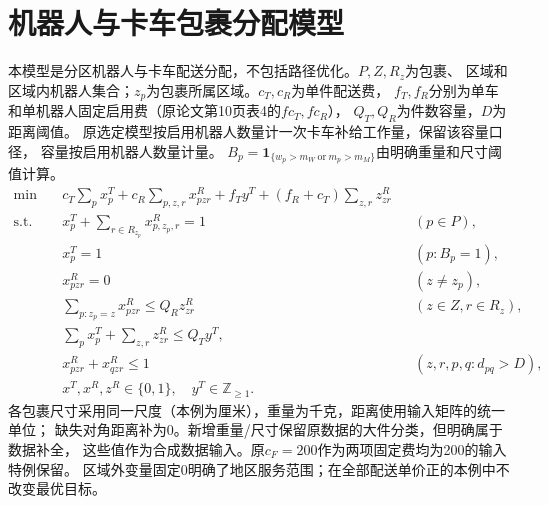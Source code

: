 \documentclass[UTF8]{ctexart}
\begin{document}
\section*{机器人与卡车包裹分配模型}

本模型是分区机器人与卡车配送分配，不包括路径优化。$P,Z,R_z$为包裹、
区域和区域内机器人集合；$z_p$为包裹所属区域。$c_T,c_R$为单件配送费，
$f_T,f_R$分别为单车和单机器人固定启用费（原论文第10页表4的$fc_T,fc_R$），
$Q_T,Q_R$为件数容量，$D$为距离阈值。
原选定模型按启用机器人数量计一次卡车补给工作量，保留该容量口径，
容量按启用机器人数量计量。
$B_p=\mathbf1_{\{w_p>m_W\ \mathrm{or}\ m_p>m_M\}}$由明确重量和尺寸阈值计算。
\begin{align*}
\min\quad &c_T\sum_px^T_p+c_R\sum_{p,z,r}x^R_{pzr}
+f_Ty^T+(f_R+c_T)\sum_{z,r}z^R_{zr}\\
\text{s.t.}\quad&
x^T_p+\sum_{r\in R_{z_p}}x^R_{p,z_p,r}=1&&(p\in P),\\
&x^T_p=1&&(p:B_p=1),\\
&x^R_{pzr}=0&&(z\ne z_p),\\
&\sum_{p:z_p=z}x^R_{pzr}\le Q_Rz^R_{zr}&&(z\in Z,r\in R_z),\\
&\sum_px^T_p+\sum_{z,r}z^R_{zr}\le Q_Ty^T,\\
&x^R_{pzr}+x^R_{qzr}\le1&&(z,r,p,q:d_{pq}>D),\\
&x^T,x^R,z^R\in\{0,1\},\quad y^T\in\mathbb Z_{\ge1}.
\end{align*}
各包裹尺寸采用同一尺度（本例为厘米），重量为千克，距离使用输入矩阵的统一单位；
缺失对角距离补为0。新增重量/尺寸保留原数据的大件分类，但明确属于数据补全，
这些值作为合成数据输入。原$c_F=200$作为两项固定费均为200的输入特例保留。
区域外变量固定0明确了地区服务范围；在全部配送单价正的本例中不改变最优目标。
\end{document}
